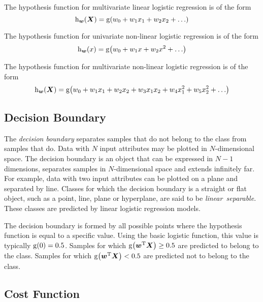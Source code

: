 The hypothesis function for multivariate linear logistic regression is of the form
\begin{equation*}
  \function[_{\boldsymbol{w}}]{h}{\boldsymbol{X}} = \function{g}{w_{0} + w_{1} x_{1} + w_{2} x_{2} + \ldots}
\end{equation*}

The hypothesis function for univariate non-linear logistic regression is of the form
\begin{equation*}
  \function[_{\boldsymbol{w}}]{h}{x} = \function{g}{w_{0} + w_{1} x + w_{2} x^{2} + \ldots}
\end{equation*}

The hypothesis function for multivariate non-linear logistic regression is of the form
\begin{equation*}
  \function[_{\boldsymbol{w}}]{h}{\boldsymbol{X}} = \function{g}{w_{0} + w_{1} x_{1} + w_{2} x_{2} + w_{3} x_{1} x_{2} + w_{4} x_{1}^{2} + w_{5} x_{2}^{2} + \ldots}
\end{equation*}

\subsection{Decision Boundary}

The \emph{decision boundary} separates samples that do not belong to the class from samples that do.
Data with \( N \) input attributes may be plotted in \( N \)-dimensional space.
The decision boundary is an object that can be expressed in \( N - 1 \) dimensions, separates samples in \( N \)-dimensional space and extends infinitely far.
For example, data with two input attributes can be plotted on a plane and separated by line.
Classes for which the decision boundary is a straight or flat object, such as a point, line, plane or hyperplane, are said to be \emph{linear~separable}.
These classes are predicted by linear logistic regression models.

The decision boundary is formed by all possible points where the hypothesis function is equal to a specific value.
Using the basic logistic function, this value is typically \( \function{g}{0} = 0.5 \).
Samples for which \( \function{g}{\boldsymbol{w}^{\mathrm{T}} \boldsymbol{X}} \geq 0.5 \) are predicted to belong to the class.
Samples for which \( \function{g}{\boldsymbol{w}^{\mathrm{T}} \boldsymbol{X}} < 0.5 \) are predicted not to belong to the class.

\subsection{Cost Function}

